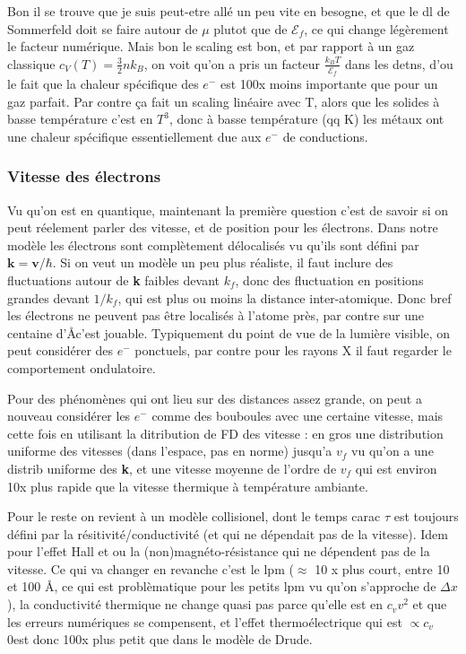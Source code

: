 \documentclass[a4paper]{report}
\begin{document}
  Bon il se trouve que je suis peut-etre allé un peu vite en besogne, et que le dl de Sommerfeld doit se faire autour de $\mu$ plutot que de $\mathcal{E}_f$, ce qui change légèrement le facteur numérique. Mais bon le scaling est bon, et par rapport à un gaz classique $c_V(T)=\frac{3}{2}nk_B$, on voit qu'on a pris un facteur $\frac{k_BT}{\mathcal{E}_f}$ dans les detns, d'ou le fait que la chaleur spécifique des $e^-$ est 100x moins importante que pour un gaz parfait. Par contre ça fait un scaling linéaire avec T, alors que les solides à basse température c'est en $T^3$, donc à basse température (qq K) les métaux ont une chaleur spécifique essentiellement due aux $e^-$ de conductions.
  
  \subsubsection{Vitesse des électrons}
  Vu qu'on est en quantique, maintenant la première question c'est de savoir si on peut réelement parler des vitesse, et de position pour les électrons. Dans notre modèle les électrons sont complètement délocalisés vu qu'ils sont défini par $\mathbf{k}=\mathbf{v}/\hbar$. Si on veut un modèle un peu plus réaliste, il faut inclure des fluctuations autour de \textbf{k} faibles devant $k_f$, donc des fluctuation en positions grandes devant $1/k_f$, qui est plus ou moins la distance inter-atomique. Donc bref les électrons ne peuvent pas être localisés à l'atome près, par contre sur une centaine d'\AA c'est jouable. Typiquement du point de vue de la lumière visible, on peut considérer des $e^-$ ponctuels, par contre pour les rayons X il faut regarder le comportement ondulatoire.
  
  Pour des phénomènes qui ont lieu sur des distances assez grande, on peut a nouveau considérer les $e^-$ comme des bouboules avec une certaine vitesse, mais cette fois en utilisant la ditribution de FD des vitesse : en gros une distribution uniforme des vitesses (dans l'espace, pas en norme) jusqu'a $v_f$ vu qu'on a une distrib uniforme des \textbf{k}, et une vitesse moyenne de l'ordre de $v_f$ qui est environ 10x plus rapide que la vitesse thermique à température ambiante.
  
  Pour le reste on revient à un modèle collisionel, dont le temps carac $\tau$ est toujours défini par la résitivité/conductivité (et qui ne dépendait pas de la vitesse). Idem pour l'effet Hall et ou la (non)magnéto-résistance qui ne dépendent pas de la vitesse. Ce qui va changer en revanche c'est le lpm ($\approx$ 10 x plus court, entre 10 et 100 \AA , ce qui est problèmatique pour les petits lpm vu qu'on s'approche de $\Delta x$), la conductivité thermique ne change quasi pas parce qu'elle est en $c_v v^2$ et que les erreurs numériques se compensent, et l'effet thermoélectrique qui est $\propto c_v$ 0est donc 100x plus petit que dans le modèle de Drude.
  
\end{document}
